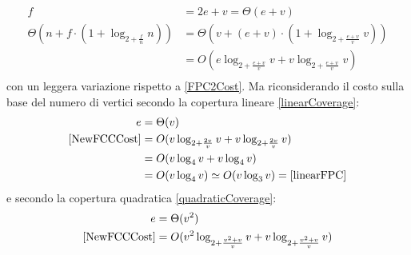 \begin{enumerate}
\begin{enumerate}[resume]
\begin{itemize}
\begin{equation}
\begin{aligned}
                                                f                                          & = 2 e + v = \Theta(e + v)                                \\
                                                \Theta(n+f\cdot (1+\log_{2+\frac{f}{n}}n)) & = \Theta(v + (e+v) \cdot ( 1+\log_{2+\frac{e+v}{v}}v))   \\
                                                                                           & = O(e\log_{2+\frac{e+v}{v}}v + v\log_{2+\frac{e+v}{v}}v) \\
                                          \end{aligned}
                                    \end{equation}
                                    con un leggera variazione rispetto a \eqref{FPC2Cost}. Ma riconsiderando il costo sulla base del numero di vertici
                                    secondo la copertura lineare \eqref{linearCoverage}:
                                    \begin{equation}
                                          \begin{aligned}
                                                e                  & = \Theta(v)                                           \\
                                                \eqref{NewFCCCost} & = O(v\log_{2+\frac{2v}{v}}v+ v\log_{2+\frac{2v}{v}}v) \\
                                                                   & = O(v\log_4v+ v\log_4v)                               \\
                                                                   & = O(v\log_4v) \simeq O(v\log_3v) = \eqref{linearFPC}
                                          \end{aligned}
                                    \end{equation}
                                    e secondo la copertura quadratica \eqref{quadraticCoverage}:
                                    \begin{equation}
                                          \begin{aligned}
                                                e                  & = \Theta(v^2)                                                       \\
                                                \eqref{NewFCCCost} & = O(v^2\log_{2+\frac{v^2+v}{v}}v+ v\log_{2+\frac{v^2+v}{v}}v)       \\

\end{aligned}
\end{equation}
\end{itemize}
\end{enumerate}
\end{enumerate}
